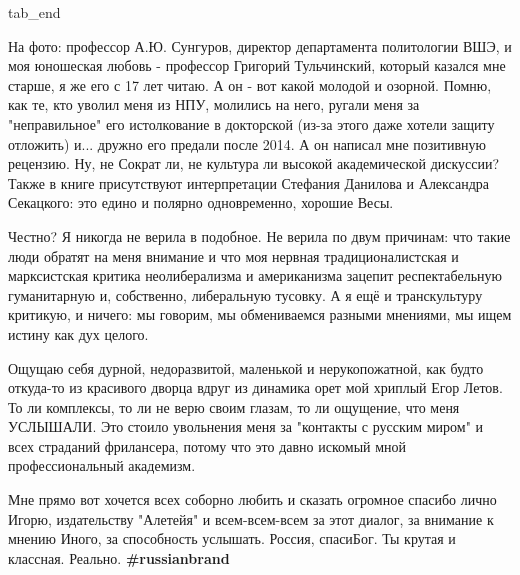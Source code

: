  tab_end
\fi

На фото: профессор А.Ю. Сунгуров, директор департамента политологии ВШЭ, и моя
юношеская любовь - профессор Григорий Тульчинский, который казался мне старше,
я же его с 17 лет читаю. А он - вот какой молодой и озорной. Помню, как те, кто
уволил меня из НПУ, молились на него, ругали меня за "неправильное" его
истолкование в докторской (из-за этого даже хотели защиту отложить) и... дружно
его предали после 2014. А он написал мне позитивную рецензию. Ну, не Сократ ли,
не культура ли высокой академической дискуссии? Также в книге присутствуют
интерпретации Стефания Данилова и Александра Секацкого: это едино и полярно
одновременно, хорошие Весы.

Честно? Я никогда не верила в подобное. Не верила по двум причинам: что такие
люди обратят на меня внимание и что моя нервная традиционалистская и
марксистская критика неолиберализма и американизма зацепит респектабельную
гуманитарную и, собственно, либеральную тусовку. А я ещё и транскультуру
критикую, и ничего: мы говорим, мы обмениваемся разными мнениями, мы ищем
истину как дух целого.

Ощущаю себя дурной, недоразвитой, маленькой и нерукопожатной, как будто
откуда-то из красивого дворца вдруг из динамика орет мой хриплый Егор Летов. То
ли комплексы, то ли не верю своим глазам, то ли ощущение, что меня УСЛЫШАЛИ.
Это стоило увольнения меня за "контакты с русским миром" и всех страданий
фрилансера, потому что это давно искомый мной профессиональный академизм. 

Мне прямо вот хочется всех соборно любить и сказать огромное спасибо лично
Игорю, издательству "Алетейя" и всем-всем-всем за этот диалог, за внимание к
мнению Иного, за способность услышать. Россия, спасиБог. Ты крутая и классная.
Реально. \textbf{\#russianbrand}
